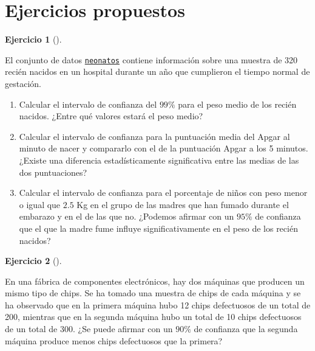 \documentclass[
  a4paper,
]{scrreport}
\theoremstyle{definition}
\newtheorem{exercise}{Ejercicio}[chapter]
\theoremstyle{remark}
\begin{document}
\hypertarget{ejercicios-propuestos-5}{%
\section{Ejercicios propuestos}\label{ejercicios-propuestos-5}}

\begin{exercise}[]\protect\hypertarget{exr-intervalos-confianza-1-poblacion-neonatos}{}\label{exr-intervalos-confianza-1-poblacion-neonatos}

El conjunto de datos
\href{https://aprendeconalf.es/estadistica-practicas-r/datos/neonatos.csv}{\texttt{neonatos}}
contiene información sobre una muestra de 320 recién nacidos en un
hospital durante un año que cumplieron el tiempo normal de gestación.

\begin{enumerate}
\def\labelenumi{\alph{enumi}.}
\item
  Calcular el intervalo de confianza del \(99\%\) para el peso medio de
  los recién nacidos. ¿Entre qué valores estará el peso medio?
\item
  Calcular el intervalo de confianza para la puntuación media del Apgar
  al minuto de nacer y compararlo con el de la puntuación Apgar a los 5
  minutos. ¿Existe una diferencia estadísticamente significativa entre
  las medias de las dos puntuaciones?
\item
  Calcular el intervalo de confianza para el porcentaje de niños con
  peso menor o igual que \(2.5\) Kg en el grupo de las madres que han
  fumado durante el embarazo y en el de las que no. ¿Podemos afirmar con
  un \(95\%\) de confianza que el que la madre fume influye
  significativamente en el peso de los recién nacidos?
\end{enumerate}

\end{exercise}

\begin{exercise}[]\protect\hypertarget{exr-intervalos-confianza-1-poblacion-piezas-defectuosas}{}\label{exr-intervalos-confianza-1-poblacion-piezas-defectuosas}

En una fábrica de componentes electrónicos, hay dos máquinas que
producen un mismo tipo de chips. Se ha tomado una muestra de chips de
cada máquina y se ha observado que en la primera máquina hubo 12 chips
defectuosos de un total de 200, mientras que en la segunda máquina hubo
un total de 10 chips defectuosos de un total de 300. ¿Se puede afirmar
con un \(90\%\) de confianza que la segunda máquina produce menos chips
defectuosos que la primera?

\end{exercise}
\end{document}
